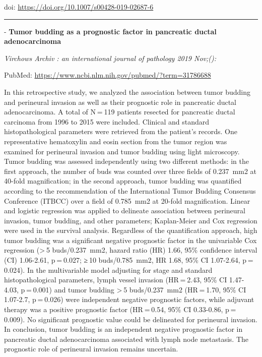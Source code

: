 \documentclass[
]{article}
\renewcommand{\linethickness}{0.05em}
\begin{document}
doi: \url{https://doi.org/10.1007/s00428-019-02687-6}

\begin{center}\rule{0.5\linewidth}{\linethickness}\end{center}

- \textbf{Tumor budding as a prognostic factor in pancreatic ductal
adenocarcinoma}

\emph{Virchows Archiv : an international journal of pathology 2019
Nov;():}

PubMed: \url{https://www.ncbi.nlm.nih.gov/pubmed/?term=31786688}

In this retrospective study, we analyzed the association between tumor
budding and perineural invasion as well as their prognostic role in
pancreatic ductal adenocarcinoma. A total of N = 119 patients resected
for pancreatic ductal carcinoma from 1996 to 2015 were included.
Clinical and standard histopathological parameters were retrieved from
the patient's records. One representative hematoxylin and eosin section
from the tumor region was examined for perineural invasion and tumor
budding using light microscopy. Tumor budding was assessed independently
using two different methods: in the first approach, the number of buds
was counted over three fields of 0.237~mm2 at 40-fold magnification; in
the second approach, tumor budding was quantified according to the
recommendation of the International Tumor Budding Consensus Conference
(ITBCC) over a field of 0.785~mm2 at 20-fold magnification. Linear and
logistic regression was applied to delineate association between
perineural invasion, tumor budding, and other parameters; Kaplan-Meier
and Cox regression were used in the survival analysis. Regardless of the
quantification approach, high tumor budding was a significant negative
prognostic factor in the univariable Cox regression (\textgreater{} 5
buds/0.237~mm2, hazard ratio (HR) 1.66, 95\% confidence interval (CI)
1.06-2.61, p = 0.027; ≥ 10 buds/0.785~mm2, HR 1.68, 95\% CI 1.07-2.64,
p = 0.024). In the multivariable model adjusting for stage and standard
histopathological parameters, lymph vessel invasion (HR = 2.43, 95\% CI
1.47-4.03, p = 0.001) and tumor budding \textgreater{} 5 buds/0.237~mm2
(HR = 1.70, 95\% CI 1.07-2.7, p = 0.026) were independent negative
prognostic factors, while adjuvant therapy was a positive prognostic
factor (HR = 0.54, 95\% CI 0.33-0.86, p = 0.009). No significant
prognostic value could be delineated for perineural invasion. In
conclusion, tumor budding is an independent negative prognostic factor
in pancreatic ductal adenocarcinoma associated with lymph node
metastasis. The prognostic role of perineural invasion remains
uncertain.
\end{document}

